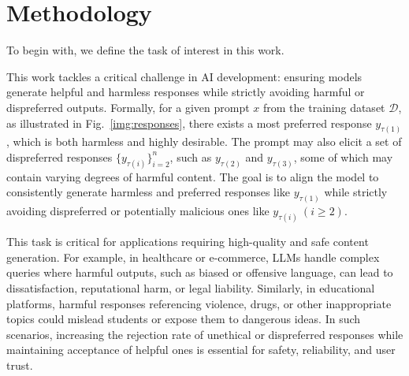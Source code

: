 \vspace{-4pt}
\section{Methodology}
\vspace{-0.5pt}
\label{sec:method}
To begin with, we define the task of interest in this work. 


\vspace{-0.5pt}

 This work tackles a critical challenge in AI development: ensuring models generate helpful and harmless responses while strictly avoiding harmful or dispreferred outputs. Formally, for a given prompt \( x \) from the training dataset \( \mathcal{D} \), as illustrated in Fig.~\ref{img:responses}, there exists a most preferred response \( y_{\tau(1)} \), which is both harmless and highly desirable. The prompt may also elicit a set of dispreferred responses \( \{y_{\tau(i)}\}_{i=2}^n \), such as \( y_{\tau(2)} \) and \( y_{\tau(3)} \), some of which may contain varying degrees of harmful content. The goal is to align the model to consistently generate harmless and preferred responses like \( y_{\tau(1)} \) while strictly avoiding dispreferred or potentially malicious ones like \( y_{\tau(i)}\  (i \geq 2) \).  

\vspace{-0.5pt}

This task is critical for applications requiring high-quality and safe content generation. For example, in healthcare or e-commerce, LLMs handle complex queries where harmful outputs, such as biased or offensive language, can lead to dissatisfaction, reputational harm, or legal liability. Similarly, in educational platforms, harmful responses referencing violence, drugs, or other inappropriate topics could mislead students or expose them to dangerous ideas. In such scenarios, increasing the rejection rate of unethical or dispreferred responses while maintaining acceptance of helpful ones is essential for safety, reliability, and user trust.  

